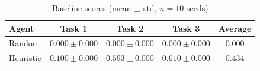 \begin{table}[h]
\centering
\caption{Baseline scores (mean $\pm$ std, $n=10$ seeds)}
\label{tab:baselines}
\begin{tabular}{lccc|c}
\toprule
Agent & Task 1 & Task 2 & Task 3 & Average \\
\midrule
Random & $0.000 \pm 0.000$ & $0.000 \pm 0.000$ & $0.000 \pm 0.000$ & $0.000$ \\
Heuristic & $0.100 \pm 0.000$ & $0.593 \pm 0.000$ & $0.610 \pm 0.000$ & $0.434$ \\
\bottomrule
\end{tabular}
\end{table}
